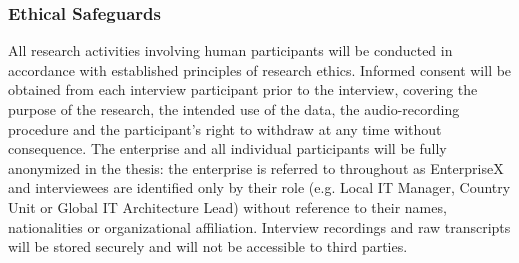 \subsubsection{Ethical Safeguards}
\label{subsubsec:EthicalSafeguards}
All research activities involving human participants will be conducted in accordance with established principles of research ethics.
Informed consent will be obtained from each interview participant prior to the interview, covering the purpose of the research, the intended use of the data, the audio-recording procedure and the participant's right to withdraw at any time without consequence.
The enterprise and all individual participants will be fully anonymized in the thesis: the enterprise is referred to throughout as EnterpriseX and interviewees are identified only by their role (e.g. \glqq{}Local IT Manager, Country Unit\grqq{} or \glqq{}Global IT Architecture Lead\grqq{}) without reference to their names, nationalities or organizational affiliation.
Interview recordings and raw transcripts will be stored securely and will not be accessible to third parties.

